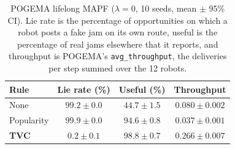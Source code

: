 \begin{table}[t]
  \caption{POGEMA lifelong MAPF ($\lambda=0$, 10 seeds, mean $\pm$ 95\% CI). Lie rate is the percentage of opportunities on which a robot posts a fake jam on its own route, useful is the percentage of real jams elsewhere that it reports, and throughput is POGEMA's \texttt{avg\_throughput}, the deliveries per step summed over the 12 robots.}
  \label{tab:pogema}
  \centering
  \small
  \setlength{\tabcolsep}{3pt}
  \begin{tabular}{lccc}
    \toprule
    Rule & Lie rate (\%)  & Useful (\%)  & Throughput  \\
    \midrule
    None       & $99.2 \pm 0.0$ & $44.7 \pm 1.5$ & $0.080 \pm 0.002$ \\
    Popularity & $99.9 \pm 0.0$ & $94.6 \pm 0.8$ & $0.037 \pm 0.001$ \\
    \textbf{TVC} & $\mathbf{0.2 \pm 0.1}$ & $\mathbf{98.8 \pm 0.7}$ & $\mathbf{0.266 \pm 0.007}$ \\
    \bottomrule
  \end{tabular}
\end{table}
